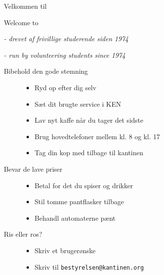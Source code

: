 \documentclass{article}
\begin{document}
\maketitle

\begin{center}
\dansk\LARGE{Velkommen til}

\english\LARGE{Welcome to}
\end{center}

\dansk{}

\begin{center}
\emph{- drevet af frivillige studerende siden 1974}

\english\emph{- run by volunteering students since 1974}
\end{center}

\LARGE

\begin{description}
\item[Bibehold den gode stemning]\hfill
\begin{itemize}
\item Ryd op efter dig selv
\item Sæt dit brugte service i KEN
\item Lav nyt kaffe når du tager det sidste
\item Brug hovedtelefoner mellem kl. 8 og kl. 17
\item Tag din kop med tilbage til kantinen
\end{itemize}
\item[Bevar de lave priser]\hfill
\begin{itemize}
\item Betal for det du spiser og drikker
\item Stil tomme pantflasker tilbage
\item Behandl automaterne pænt
\end{itemize}
\item[Ris eller ros?]\hfill
\begin{itemize}
\item Skriv et brugerønske
\item Skriv til \texttt{bestyrelsen@kantinen.org}
\end{itemize}
\end{description}

\dansk
\underskriv
\end{document}
